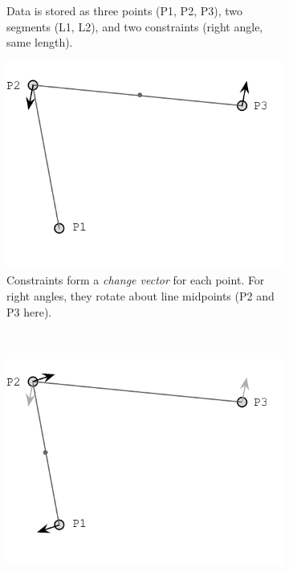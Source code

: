 \begin{figure}
\begin{subfigure}[t]{51mm}
    \caption{Data is stored as three points (P1, P2, P3), two segments
      (L1, L2), and two constraints (right angle, same length).}
    \label{fig:solving-state}
  \end{subfigure}
  \hspace{1mm} %
  \begin{subfigure}[t]{51mm}
    \includegraphics[width=\linewidth]{img/solving-angle-1.pdf}
    \caption{Constraints form a \textit{change vector} for each
      point. For right angles, they rotate about line midpoints (P2
      and P3 here).}
    \label{fig:solving-angle-1}
  \end{subfigure}
  \\ \vspace{5mm}
  \begin{subfigure}[t]{51mm}
    \includegraphics[width=\linewidth]{img/solving-angle-2.pdf}

\end{subfigure}
\end{figure}
